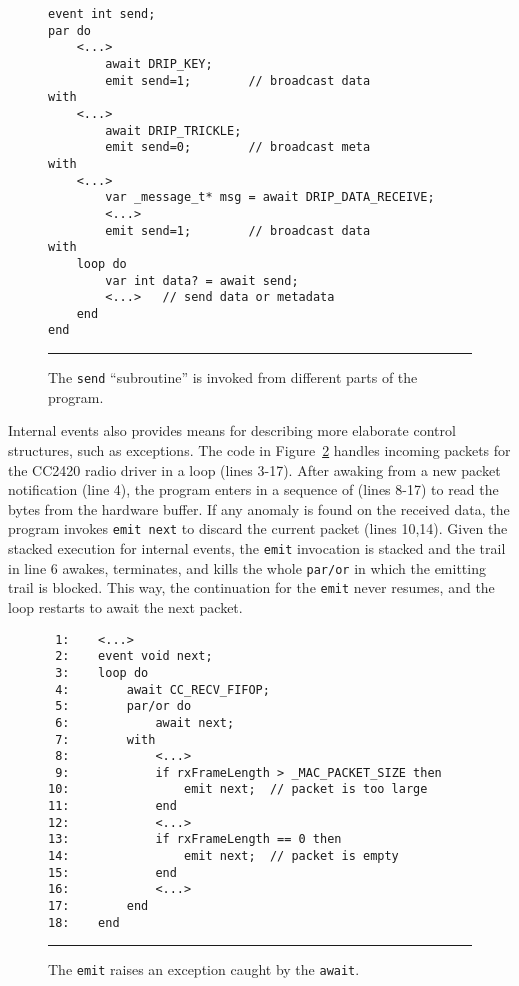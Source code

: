 \documentclass[10pt]{sensys-proc}
\newcommand{\code}[1] {{\small{\texttt{#1}}}}
\begin{document}
\begin{figure}[t]
{\small
\begin{verbatim}
event int send;
par do
    <...>
        await DRIP_KEY;
        emit send=1;        // broadcast data
with
    <...>
        await DRIP_TRICKLE;
        emit send=0;        // broadcast meta
with
    <...>
        var _message_t* msg = await DRIP_DATA_RECEIVE;
        <...>
        emit send=1;        // broadcast data
with
    loop do
        var int data? = await send;
        <...>   // send data or metadata
    end
end
\end{verbatim}
}
\rule{8.5cm}{0.37pt}
\caption{ The \code{send} ``subroutine'' is invoked from different parts of the 
program.
\label{lst.func}
}
\end{figure}

Internal events also provides means for describing more elaborate control 
structures, such as exceptions.
The code in Figure~\ref{lst.exception} handles incoming packets for the CC2420 
radio driver in a loop (lines 3-17).
After awaking from a new packet notification (line 4), the program enters in a 
sequence of (lines 8-17) to read the bytes from the hardware buffer.
If any anomaly is found on the received data, the program invokes 
\code{emit~next} to discard the current packet (lines 10,14).
Given the stacked execution for internal events, the \code{emit} invocation is 
stacked and the trail in line 6 awakes, terminates, and kills the whole 
\code{par/or} in which the emitting trail is blocked.
This way, the continuation for the \code{emit} never resumes, and the loop 
restarts to await the next packet.

\begin{figure}[t]
{\small
\begin{verbatim}
 1:    <...>
 2:    event void next;
 3:    loop do
 4:        await CC_RECV_FIFOP;
 5:        par/or do
 6:            await next;
 7:        with
 8:            <...>
 9:            if rxFrameLength > _MAC_PACKET_SIZE then
10:                emit next;  // packet is too large
11:            end
12:            <...>
13:            if rxFrameLength == 0 then
14:                emit next;  // packet is empty
15:            end
16:            <...>
17:        end
18:    end
\end{verbatim}
}
\rule{8.5cm}{0.37pt}
\caption{ The \code{emit} raises an exception caught by the \code{await}.
\label{lst.exception}
}
\end{figure}
\end{document}
